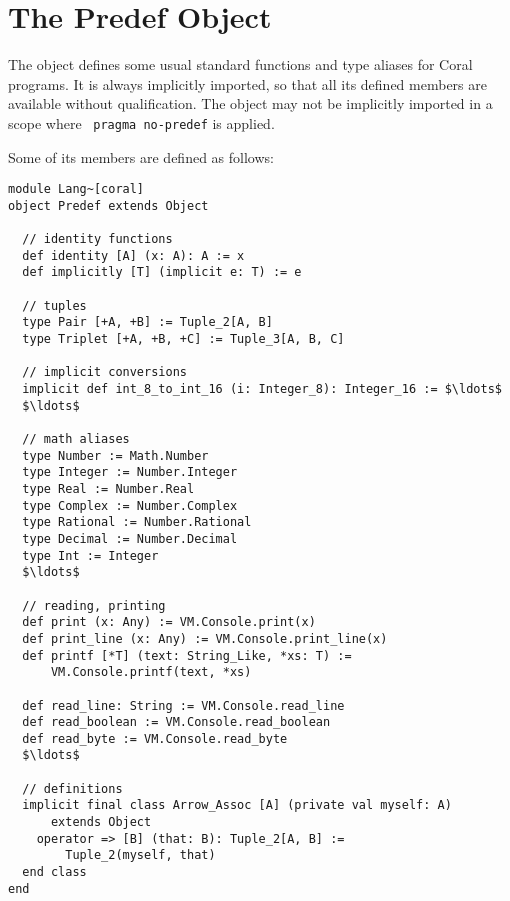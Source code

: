 \section{The Predef Object}
\label{sec:predef}

The  object defines some usual standard functions and type aliases for Coral programs. It is always implicitly imported, so that all its defined members are available without qualification. The  object may not be implicitly imported in a scope where ~\lstinline!pragma no-predef! is applied. 

Some of its members are defined as follows:

\begin{minipage}{\linewidth}
\begin{lstlisting}
module Lang~[coral]
object Predef extends Object

  // identity functions
  def identity [A] (x: A): A := x
  def implicitly [T] (implicit e: T) := e

  // tuples
  type Pair [+A, +B] := Tuple_2[A, B]
  type Triplet [+A, +B, +C] := Tuple_3[A, B, C]

  // implicit conversions
  implicit def int_8_to_int_16 (i: Integer_8): Integer_16 := $\ldots$
  $\ldots$

  // math aliases
  type Number := Math.Number
  type Integer := Number.Integer
  type Real := Number.Real
  type Complex := Number.Complex
  type Rational := Number.Rational
  type Decimal := Number.Decimal
  type Int := Integer
  $\ldots$
  
  // reading, printing
  def print (x: Any) := VM.Console.print(x)
  def print_line (x: Any) := VM.Console.print_line(x)
  def printf [*T] (text: String_Like, *xs: T) := 
      VM.Console.printf(text, *xs)
  
  def read_line: String := VM.Console.read_line
  def read_boolean := VM.Console.read_boolean
  def read_byte := VM.Console.read_byte
  $\ldots$
  
  // definitions
  implicit final class Arrow_Assoc [A] (private val myself: A)
      extends Object
    operator => [B] (that: B): Tuple_2[A, B] := 
        Tuple_2(myself, that)
  end class
end
\end{lstlisting}
\end{minipage}






